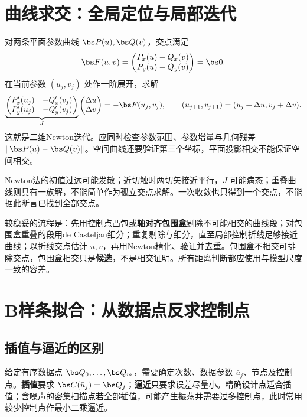 \section{曲线求交：全局定位与局部迭代}

对两条平面参数曲线 $\bs P(u),\bs Q(v)$，交点满足
\[
 \bs F(u,v)=\begin{pmatrix}P_x(u)-Q_x(v)\\P_y(u)-Q_y(v)\end{pmatrix}=\bs0.
\]
在当前参数 $(u_j,v_j)$ 处作一阶展开，求解
\[
 \underbrace{\begin{pmatrix}P_x'(u_j)&-Q_x'(v_j)\\P_y'(u_j)&-Q_y'(v_j)\end{pmatrix}}_{J}
 \begin{pmatrix}\Delta u\\\Delta v\end{pmatrix}
 =-\bs F(u_j,v_j),\qquad
 (u_{j+1},v_{j+1})=(u_j+\Delta u,v_j+\Delta v).
\]
这就是二维Newton迭代。应同时检查参数范围、参数增量与几何残差 $\|\bs P(u)-\bs Q(v)\|$。空间曲线还要验证第三个坐标，平面投影相交不能保证空间相交。


Newton法的初值过远可能发散；近切触时两切矢接近平行，$J$ 可能病态；重叠曲线则具有一族解，不能简单作为孤立交点求解。一次收敛也只得到一个交点，不能据此断言已找到全部交点。

较稳妥的流程是：先用控制点凸包或\textbf{轴对齐包围盒}剔除不可能相交的曲线段；对包围盒重叠的段用de Casteljau细分；重复剔除与细分，直至局部控制折线足够接近曲线；以折线交点估计 $u,v$，再用Newton精化、验证并去重。包围盒不相交可排除交点，包围盒相交只是\textbf{候选}，不是相交证明。所有距离判断都应使用与模型尺度一致的容差。

\section{B样条拟合：从数据点反求控制点}

\subsection{插值与逼近的区别}
给定有序数据点 $\bs Q_0,\ldots,\bs Q_m$，需要确定次数、数据参数 $\bar u_j$、节点及控制点。\textbf{插值}要求 $\bs C(\bar u_j)=\bs Q_j$；\textbf{逼近}只要求误差尽量小。精确设计点适合插值；含噪声的密集扫描点若全部插值，可能产生振荡并需要过多控制点，此时常用较少控制点作最小二乘逼近。

